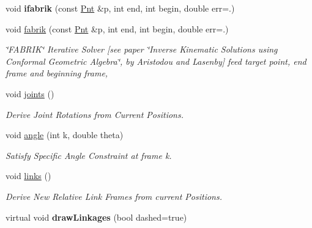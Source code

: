 \begin{DoxyCompactItemize}
\item 
\hypertarget{classvsr_1_1_chain_abdd0ef6d14d537aa75597dd03fdcff21}{void {\bfseries ifabrik} (const \hyperlink{namespacevsr_a2d05beb9721c5d9211b479af6d47222d}{Pnt} \&p, int end, int begin, double err=.)}\label{classvsr_1_1_chain_abdd0ef6d14d537aa75597dd03fdcff21}

\item 
\hypertarget{classvsr_1_1_chain_a0c295c677f9f030f2db18dbf604568c3}{void \hyperlink{classvsr_1_1_chain_a0c295c677f9f030f2db18dbf604568c3}{fabrik} (const \hyperlink{namespacevsr_a2d05beb9721c5d9211b479af6d47222d}{Pnt} \&p, int end, int begin, double err=.)}\label{classvsr_1_1_chain_a0c295c677f9f030f2db18dbf604568c3}

\begin{DoxyCompactList}\small\item\em \char`\"{}\-F\-A\-B\-R\-I\-K\char`\"{} Iterative Solver \mbox{[}see paper \char`\"{}\-Inverse Kinematic Solutions using Conformal Geometric Algebra\char`\"{}, by Aristodou and Lasenby\mbox{]} feed target point, end frame and beginning frame, \end{DoxyCompactList}\item 
\hypertarget{classvsr_1_1_chain_a305f7794a9c054e782ad41abd7dd6c0b}{void \hyperlink{classvsr_1_1_chain_a305f7794a9c054e782ad41abd7dd6c0b}{joints} ()}\label{classvsr_1_1_chain_a305f7794a9c054e782ad41abd7dd6c0b}

\begin{DoxyCompactList}\small\item\em Derive Joint Rotations from Current Positions. \end{DoxyCompactList}\item 
\hypertarget{classvsr_1_1_chain_a5dbddb2e8b9a3f17aae872051b73daec}{void \hyperlink{classvsr_1_1_chain_a5dbddb2e8b9a3f17aae872051b73daec}{angle} (int k, double theta)}\label{classvsr_1_1_chain_a5dbddb2e8b9a3f17aae872051b73daec}

\begin{DoxyCompactList}\small\item\em Satisfy Specific Angle Constraint at frame k. \end{DoxyCompactList}\item 
\hypertarget{classvsr_1_1_chain_a1f683ad43253f7e480e29d6777bb5ec2}{void \hyperlink{classvsr_1_1_chain_a1f683ad43253f7e480e29d6777bb5ec2}{links} ()}\label{classvsr_1_1_chain_a1f683ad43253f7e480e29d6777bb5ec2}

\begin{DoxyCompactList}\small\item\em Derive New Relative Link Frames from current Positions. \end{DoxyCompactList}\item 
\hypertarget{classvsr_1_1_chain_a98bac6b44d6811bb9eec3eff1872a1cb}{virtual void {\bfseries draw\-Linkages} (bool dashed=true)}\label{classvsr_1_1_chain_a98bac6b44d6811bb9eec3eff1872a1cb}


\end{DoxyCompactItemize}
